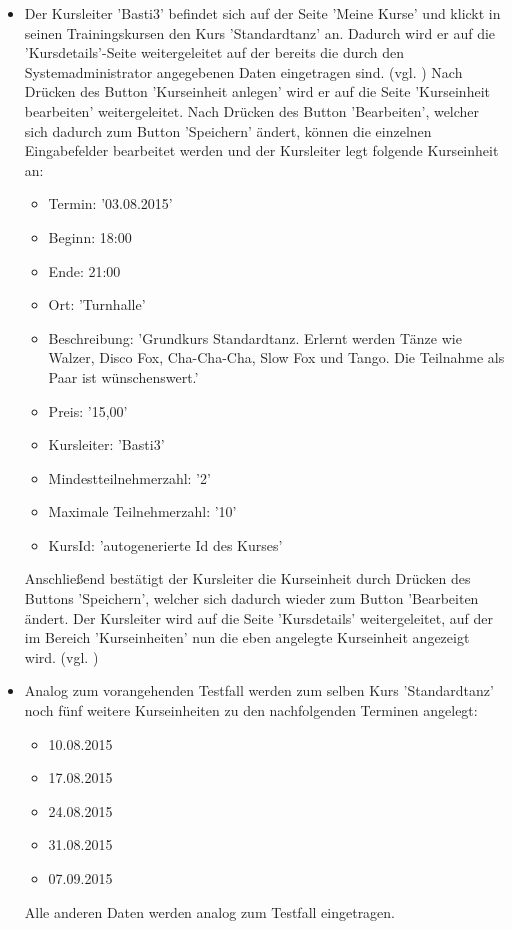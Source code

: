 \documentclass[a4paper]{scrreprt}
\begin{document}
\begin{itemize}
			\item {} 
			Der Kursleiter 'Basti3' befindet sich auf der Seite 'Meine Kurse' und klickt in seinen Trainingskursen den Kurs 'Standardtanz' an. Dadurch wird er auf die 'Kursdetails'-Seite weitergeleitet auf der bereits die durch den Systemadministrator angegebenen Daten eingetragen sind. (vgl. ) Nach Drücken des Button 'Kurseinheit anlegen' wird er auf die Seite 'Kurseinheit bearbeiten' weitergeleitet. Nach Drücken des Button 'Bearbeiten', welcher sich dadurch zum Button 'Speichern' ändert, können die einzelnen Eingabefelder bearbeitet werden und der Kursleiter legt folgende Kurseinheit an:
			\begin{itemize}
				\item Termin: '03.08.2015'
				\item Beginn: 18:00
				\item Ende: 21:00
				\item Ort: 'Turnhalle'
				\item Beschreibung: 'Grundkurs Standardtanz. Erlernt werden Tänze wie Walzer, Disco Fox, Cha-Cha-Cha, Slow Fox und Tango. Die Teilnahme als Paar ist wünschenswert.'
				\item Preis: '15,00'
				\item Kursleiter: 'Basti3'
				\item Mindestteilnehmerzahl: '2'
				\item Maximale Teilnehmerzahl: '10'
				\item KursId: 'autogenerierte Id des Kurses'
			\end{itemize}	
			Anschließend bestätigt der Kursleiter die Kurseinheit durch Drücken des Buttons 'Speichern', welcher sich dadurch wieder zum Button 'Bearbeiten ändert. Der Kursleiter wird auf die Seite 'Kursdetails' weitergeleitet, auf der im Bereich 'Kurseinheiten' nun die eben angelegte Kurseinheit angezeigt wird. (vgl. )
			
			\item {} 
			Analog zum vorangehenden Testfall  werden zum selben Kurs 'Standardtanz' noch fünf weitere Kurseinheiten zu den nachfolgenden Terminen angelegt:
			\begin{itemize}
				\item 10.08.2015
				\item 17.08.2015
				\item 24.08.2015
				\item 31.08.2015
				\item 07.09.2015
			\end{itemize}		
			Alle anderen Daten werden analog zum Testfall  eingetragen.
			

\end{itemize}
\end{document}
